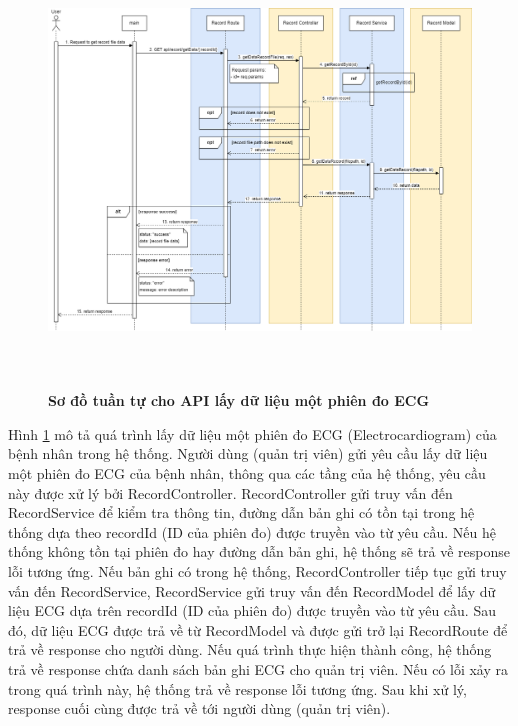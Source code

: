  \begin{figure}[H]
  \centering
  \includegraphics[width=16cm,height=11.5cm]{Images/sequence_api/getRecordDataById.png}
  \caption[Sơ đồ tuần tự cho API lấy dữ liệu một phiên đo ECG ]{\bfseries \fontsize{12pt}{0pt}
  \selectfont Sơ đồ tuần tự cho API lấy dữ liệu một phiên đo ECG }
  \label{getRecordDataById} %
\end{figure}
Hình \ref{getRecordDataById} mô tả quá trình lấy dữ liệu một phiên đo ECG (Electrocardiogram) của bệnh nhân trong hệ thống. Người dùng (quản trị viên) gửi yêu cầu lấy dữ liệu một phiên đo ECG của bệnh nhân, thông qua các tầng của hệ thống, 
yêu cầu này được xử lý bởi RecordController. RecordController gửi truy vấn đến RecordService để kiểm tra thông tin, đường dẫn bản ghi có tồn tại trong hệ thống dựa theo recordId (ID của phiên đo) được truyền vào từ yêu cầu. Nếu hệ thống không tồn tại phiên đo hay đường dẫn bản ghi, hệ thống sẽ
trả về response lỗi tương ứng. Nếu bản ghi có trong hệ thống, RecordController tiếp tục gửi truy vấn đến RecordService, RecordService gửi truy vấn đến RecordModel để lấy dữ liệu ECG dựa trên recordId (ID của phiên đo) được truyền vào từ yêu cầu. 
Sau đó, dữ liệu ECG được trả về từ RecordModel và được gửi trở lại RecordRoute để trả về response cho người dùng. Nếu quá trình thực hiện thành công, hệ thống trả về response chứa danh sách bản ghi ECG cho quản trị viên. Nếu có lỗi xảy ra
 trong quá trình này, hệ thống trả về response lỗi tương ứng. Sau khi xử lý, response cuối cùng được trả về tới người dùng (quản trị viên).


